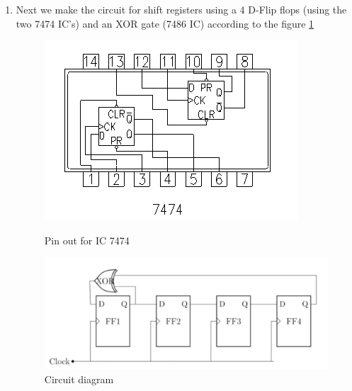 \documentclass[journal,12pt,twocolumn]{IEEEtran}
\begin{document}
\begin{enumerate}
	\item Next we make the circuit for shift registers using a 4 D-Flip flops (using the two 7474 IC's) and an XOR gate (7486 IC) according to the figure \ref{Circuit} 
	\begin{figure}[h]
		\includegraphics[width=\columnwidth]{figs/IC7474.png}
		\caption{Pin out for IC 7474}
		\label{7474_IC}
		\includegraphics[width=\columnwidth]{figs/circuit_connections.jpg}
		\caption{Circuit diagram}
		\label{Circuit}
	\end{figure}


\end{enumerate}
\end{document}
